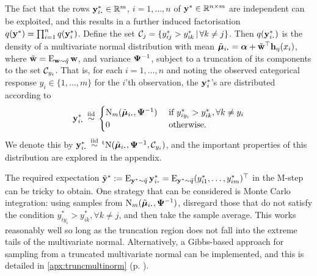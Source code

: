 The fact that the rows $\by_{i \bigcdot}^* \in \bbR^m$, $i=1,\dots,n$ of ${\mathbf y}^* \in \mathbb{R}^{n \times m}$ are independent can be exploited, and this results in a further induced factorisation $q({\mathbf y}^*) = \prod_{i=1}^n q({\mathbf y}_i^*)$.
Define the set ${\mathcal C}_j = \{y_{ij}^* > y_{ik}^* \,|\, \forall k\neq j \}$.
Then $q(\by_{i \bigcdot}^*)$ is the density of a multivariate normal distribution with mean $\tilde \bmu_{i \bigcdot} = \balpha + \tilde\bw^\top  \bh_\eta(x_i)$, where $\tilde {{\mathbf w}} = \operatorname{E}_{{\mathbf w}\sim\tilde q}{\mathbf w}$, and variance ${\bm\Psi}^{-1}$, subject to a truncation of its components to the set ${\mathcal C}_{y_i}$.
That is, for each $i=1,\dots,n$ and noting the observed categorical response $y_i \in \{1,\dots,m\}$ for the $i$'th observation, the ${\mathbf y}_i^*$'s are distributed according to
\begin{align}\label{eq:ystardist}
  \by_{i \bigcdot}^* \iid
  \begin{cases}
    \N_m(\tilde\bmu_{i \bigcdot},  \bPsi^{-1}) & \text{ if } y_{iy_i}^* > y_{ik}^*, \forall k \neq y_i \\
    0 & \text{ otherwise}. \\
  \end{cases}
\end{align}
We denote this by $\by_{i \bigcdot}^* \iid \tN(\tilde\bmu_{i \bigcdot}, \bPsi^{-1},\cC_{y_i})$, and the important properties of this distribution are explored in the appendix.

The required expectation $\tilde\by^* := \E_{\by^*\sim\tilde q}\by^*_{i\bigcdot} = \E_{\by^*\sim\tilde q} (y_{i1}^*,\dots, y_{im}^*)^\top$ in the M-step can be tricky to obtain.
One strategy that can be considered is Monte Carlo integration: using samples from $\N_m(\tilde\bmu_{i \bigcdot},  \bPsi^{-1})$, disregard those that do not satisfy the condition $y_{iy_i}^* > y_{ik}^*, \forall k \neq j$, and then take the sample average.
This works reasonably well so long as the truncation region does not fall into the extreme tails of the multivariate normal.
Alternatively, a Gibbs-based approach \citep{robert1995simulation} for sampling from a truncated multivariate normal can be implemented, and this is detailed in \cref{apx:truncmultinorm} (p. \pageref{apx:truncmultinorm}).

